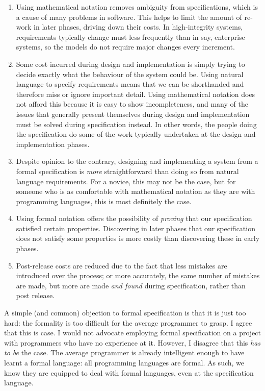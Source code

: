\begin{enumerate}
 \item Using mathematical notation removes ambiguity from specifications, which is a cause of many problems in software. This helps to limit the amount of re-work in later phases, driving down their costs. In high-integrity systems, requirements typically change must less frequently than in say, enterprise systems, so the models do not require major changes every increment.

 \item Some cost incurred during design and implementation is simply trying to decide exactly what the behaviour of the system could be. Using natural language to specify requirements means that we can be shorthanded and therefore miss or ignore important detail. Using mathematical notation does not afford this because it is easy to show incompleteness, and many of the issues that generally present themselves during design and implementation must be solved during specification instead. In other words, the people doing the specification do some of the work typically undertaken at the design and implementation phases.


 \item Despite opinion to the contrary, designing and implementing a system from a formal specification is \emph{more} straightforward than doing so from natural language requirements. For a novice, this may not be the case, but for someone who is as comfortable with mathematical notation as they are with programming languages, this is most definitely the case.

 \item Using formal notation offers the possibility of \emph{proving} that our specification satisfied certain properties. Discovering in later phases that our specification does not satisfy some properties is more costly than discovering these in early phases.

 \item Post-release costs are reduced due to the fact that less mistakes are introduced over the process; or more accurately, the same number of mistakes are made, but more are made \emph{and found} during specification, rather than post release.
\end{enumerate}

A simple (and common) objection to formal specification is that it is just too hard: the formality is too difficult for the average programmer to grasp. I agree that this is case. I would not advocate employing formal specification on a project with programmers who have no experience at it. However, I disagree that this \emph{has to be} the case. The average programmer is already intelligent enough to have learnt a formal language: all programming languages are formal. As such, we know they are equipped to deal with formal languages, even at the specification language. 


